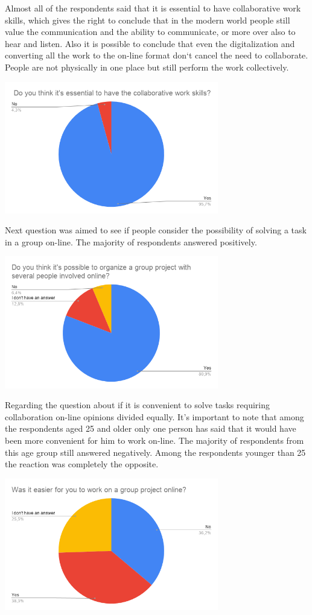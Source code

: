\documentclass[10pt,oneside,english,a4paper]{article}
\begin{document}
Almost all of the respondents said that it is essential to have collaborative work skills, which gives the right to conclude that in the modern world people still value the communication and the ability to communicate, or more over also to hear and listen. Also it is possible to conclude that even the digitalization and converting all the work to the on-line format don`t cancel the need to collaborate. People are not physically in one place but still perform the work collectively.

\includegraphics[width=0.7\textwidth]{diagram2.png}

Next question was aimed to see if people consider the possibility of solving a task in a group on-line. The majority of respondents answered positively. 

\includegraphics[width=0.7\textwidth]{diagram1.png}

Regarding the question about if it is convenient to solve tasks requiring collaboration on-line opinions divided equally. It's important to note that among the respondents aged 25 and older only one person has said that it would have been more convenient for him to work on-line. The majority of respondents from this age group still answered negatively. 
Among the respondents younger than 25 the reaction was completely the opposite. 

\includegraphics[width=0.7\textwidth]{group_work.png}
\end{document}
